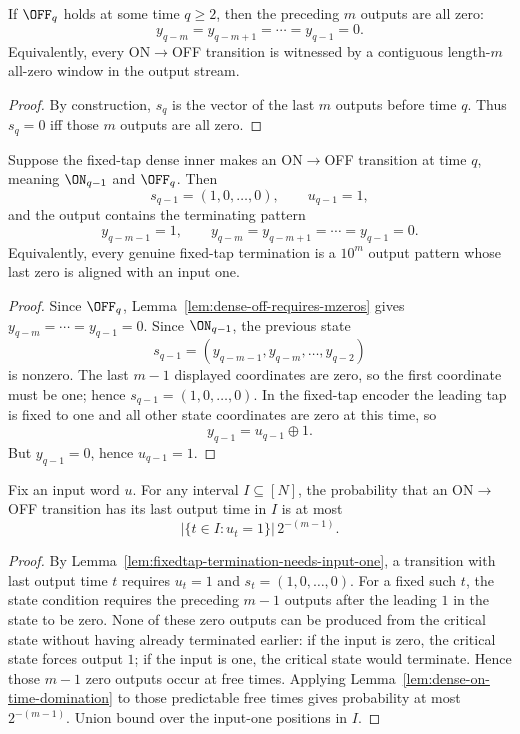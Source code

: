 \begin{lemma}
\label{lem:dense-off-requires-mzeros}
If $\OFF_q$ holds at some time $q\ge 2$, then the preceding $m$ outputs are all zero:
\[
y_{q-m}=y_{q-m+1}=\cdots=y_{q-1}=0.
\]
Equivalently, every ON$\to$OFF transition is witnessed by a contiguous length-$m$ all-zero window in the output stream.
\end{lemma}

\begin{proof}
By construction, $s_q$ is the vector of the last $m$ outputs before time $q$. Thus $s_q=0$ iff those $m$ outputs are all zero.
\end{proof}

\begin{lemma}
\label{lem:fixedtap-termination-needs-input-one}
Suppose the fixed-tap dense inner makes an ON\(\to\)OFF transition at time \(q\), meaning \(\ON_{q-1}\) and
\(\OFF_q\). Then
\[
s_{q-1}=(1,0,\dots,0),
\qquad
u_{q-1}=1,
\]
and the output contains the terminating pattern
\[
y_{q-m-1}=1,
\qquad
y_{q-m}=y_{q-m+1}=\cdots=y_{q-1}=0.
\]
Equivalently, every genuine fixed-tap termination is a \(10^m\) output pattern whose last zero is aligned with an input
one.
\end{lemma}

\begin{proof}
Since \(\OFF_q\), Lemma~\ref{lem:dense-off-requires-mzeros} gives
\(y_{q-m}=\cdots=y_{q-1}=0\). Since \(\ON_{q-1}\), the previous state
\[
s_{q-1}=(y_{q-m-1},y_{q-m},\dots,y_{q-2})
\]
is nonzero. The last \(m-1\) displayed coordinates are zero, so the first coordinate must be one; hence
\(s_{q-1}=(1,0,\dots,0)\). In the fixed-tap encoder the leading tap is fixed to one and all other state coordinates are
zero at this time, so
\[
y_{q-1}=u_{q-1}\oplus 1.
\]
But \(y_{q-1}=0\), hence \(u_{q-1}=1\).
\end{proof}

\begin{lemma}
\label{lem:fixedtap-termination-candidates}
Fix an input word \(u\). For any interval \(I\subseteq[N]\), the probability that an ON\(\to\)OFF transition has its
last output time in \(I\) is at most
\[
|\{t\in I:u_t=1\}|\,2^{-(m-1)}.
\]
\end{lemma}

\begin{proof}
By Lemma~\ref{lem:fixedtap-termination-needs-input-one}, a transition with last output time \(t\) requires \(u_t=1\)
and \(s_t=(1,0,\dots,0)\). For a fixed such \(t\), the state condition requires the preceding \(m-1\) outputs after
the leading \(1\) in the state to be zero. None of these zero outputs can be produced from the critical state without
having already terminated earlier: if the input is zero, the critical state forces output \(1\); if the input is one,
the critical state would terminate. Hence those \(m-1\) zero outputs occur at free times. Applying
Lemma~\ref{lem:dense-on-time-domination} to those predictable free times gives probability at most \(2^{-(m-1)}\).
Union bound over the input-one positions in \(I\).
\end{proof}

